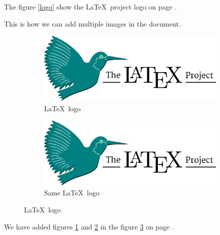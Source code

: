 \documentclass[12pt, letter]{article}
\begin{document}
The figure \ref{logo} show the \LaTeX\ project logo on page \pageref{logo}.
   
   
This is how we can add multiple images in the document.

\begin{figure}[h!]
	\centering
	\begin{subfigure}[b]{0.4\linewidth}
		\includegraphics[width=\linewidth]{latex-logo}
		\caption{\LaTeX\ logo}
		\label{logo1}
	\end{subfigure}
	\hfill
	\begin{subfigure}[b]{0.4\linewidth}
		\includegraphics[width=\linewidth]{latex-logo}
		\caption{Same \LaTeX\ logo}
		\label{logo2}
	\end{subfigure}
	
	\caption{\LaTeX\ logo}
	\label{logo3}
	
\end{figure}

We have added figures \ref{logo1} and \ref{logo2} in the figure \ref{logo3} on page \pageref{logo3}.
 
\medskip

\end{document}
